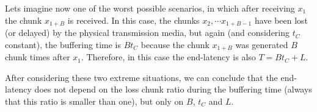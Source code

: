 Lets imagine now one of the worst possible scenarios, in which after
receiving $x_1$ the chunk $x_{1+B}$ is received. In this case, the
chunks $x_2, \cdots x_{1+B-1}$ have been lost (or delayed) by the
physical transmission media, but again (and considering $t_C$
constant), the buffering time is $Bt_C$ because the chunk $x_{1+B}$
was generated $B$ chunk times after $x_1$. Therefore, in this case the
end-latency is also $T=Bt_C+L$.

After considering these two extreme situations, we can conclude that
the end-latency does not depend on the loss chunk ratio during the
buffering time (always that this ratio is smaller than one), but only
on $B$, $t_C$ and $L$.


\begin{comment}
An heuristic that
works is the described in the Fig.~\ref{fig:DBS_peer_buffering}. As
can be seen, $\text{chunk\_to\_play}$ points to the first received
chunk, that not necessary is the received chunk with lower
index. After that, the
buffering finishes when a chunk with index $\text{chunk\_to\_play} +
\text{BUFFER\_SIZE}/2$ has been received.\footnote{This not means that
  $\text{BUFFER\_SIZE}/2$ chunks are available in the buffer.}
\end{comment}
